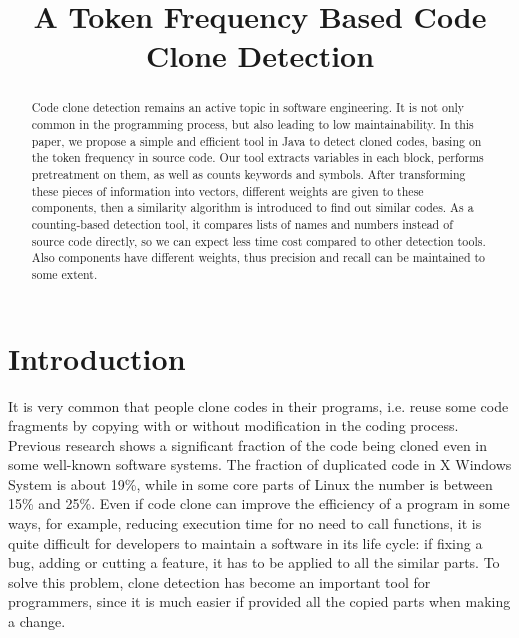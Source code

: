 \documentclass[conference]{IEEEtran}
\begin{document}
\title{A Token Frequency Based Code Clone Detection}

\author{
}

\maketitle


\begin{abstract}
Code clone detection remains an active topic in software engineering. It is not only common in the programming process, but also leading to low maintainability. 
In this paper, we propose a simple and efficient tool in Java to detect cloned codes, basing on the token frequency in source code. Our tool extracts variables in each block, performs pretreatment on them, as well as counts keywords and symbols. After transforming these pieces of information into vectors, different weights are given to these components, then a similarity algorithm is introduced to find out similar codes. 
As a counting-based detection tool, it compares lists of names and numbers instead of source code directly, so we can expect less time cost compared to other detection tools. Also components have different weights, thus precision and recall can be maintained to some extent. \\
\end{abstract}

\section{Introduction}

It is very common that people clone codes in their programs, i.e. reuse some code fragments by copying with or without modification in the coding process. 
Previous research shows a significant fraction of the code being cloned even in some well-known software systems. The fraction of duplicated code in X Windows System is about 19\%\cite{cloneinsys1}, while in some core parts of Linux the number is between 15\% and 25\%\cite{cloneinsys2}. 
Even if code clone can improve the efficiency of a program in some ways, for example, reducing execution time for no need to call functions, it is quite difficult for developers to maintain a software in its life cycle: if fixing a bug, adding or cutting a feature, it has to be applied to all the similar parts. To solve this problem, clone detection has become an important tool for programmers, since it is much easier if provided all the copied parts when making a change.
\end{document}
